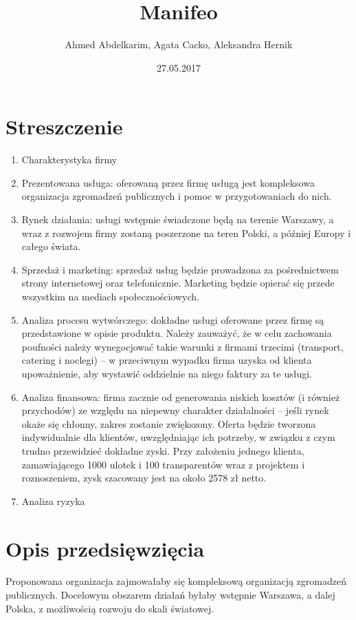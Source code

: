 \documentclass{article}
\title{\Huge{Manifeo}\\ %
}
\author{\large{Ahmed Abdelkarim, Agata Cacko, Aleksandra Hernik}}
\date{\large{27.05.2017}}
\begin{document}
\maketitle
\vspace{2cm}
\tableofcontents
\newpage




\section{Streszczenie}
\begin{enumerate}
\item Charakterystyka firmy
\item Prezentowana usługa: oferowaną przez firmę usługą jest kompleksowa organizacja zgromadzeń publicznych i pomoc w przygotowaniach do nich.
\item Rynek działania: usługi wstępnie świadczone będą na terenie Warszawy, a wraz z rozwojem firmy zostaną poszerzone na teren Polski, a później Europy i całego świata.
\item Sprzedaż i marketing: sprzedaż usług będzie prowadzona za pośrednictwem strony internetowej oraz telefonicznie. Marketing będzie opierać się przede wszystkim na mediach społecznościowych. 
\item Analiza procesu wytwórczego: dokładne usługi oferowane przez firmę są przedstawione w opisie produktu. Należy zauważyć, że w celu zachowania poufności należy wynegocjować takie warunki z firmami trzecimi (transport, catering i noclegi) -- w przeciwnym wypadku firma uzyska od klienta upoważnienie, aby wystawić oddzielnie na niego faktury za te usługi. 
\item Analiza finansowa: firma zacznie od generowania niskich kosztów (i również przychodów) ze względu na niepewny charakter działalności -- jeśli rynek okaże się chłonny, zakres zostanie zwiększony. Oferta będzie tworzona indywidualnie dla klientów, uwzględniając ich potrzeby, w związku z czym trudno przewidzieć dokładne zyski. Przy założeniu jednego klienta, zamawiającego 1000 ulotek i 100 transparentów wraz z projektem i roznoszeniem, zysk szacowany jest na około 2578 zł netto.
\item Analiza ryzyka 
\end{enumerate}

\section{Opis przedsięwzięcia}
Proponowana organizacja zajmowałaby się kompleksową organizacją zgromadzeń publicznych. Docelowym obszarem działań byłaby wstępnie Warszawa, a dalej Polska, z możliwością rozwoju do skali światowej.   
\end{document}
